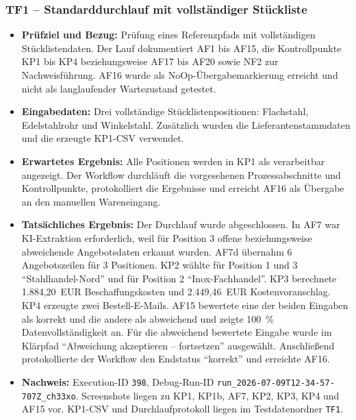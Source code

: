 \documentclass[a4paper,12pt]{article}
\begin{document}
\subsubsection{TF1 -- Standarddurchlauf mit vollständiger Stückliste}

\begin{itemize}
    \setlength{\itemsep}{3pt}
    \setlength{\parsep}{0pt}
    \item \textbf{Prüfziel und Bezug:} Prüfung eines Referenzpfads mit vollständigen Stücklistendaten. Der Lauf dokumentiert AF1 bis AF15, die Kontrollpunkte KP1 bis KP4 beziehungsweise AF17 bis AF20 sowie NF2 zur Nachweisführung. AF16 wurde als NoOp-Übergabemarkierung erreicht und nicht als langlaufender Wartezustand getestet.
    \item \textbf{Eingabedaten:} Drei vollständige Stücklistenpositionen: Flachstahl, Edelstahlrohr und Winkelstahl. Zusätzlich wurden die Lieferantenstammdaten und die erzeugte KP1-CSV verwendet.
    \item \textbf{Erwartetes Ergebnis:} Alle Positionen werden in KP1 als verarbeitbar angezeigt. Der Workflow durchläuft die vorgesehenen Prozessabschnitte und Kontrollpunkte, protokolliert die Ergebnisse und erreicht AF16 als Übergabe an den manuellen Wareneingang.
    \item \textbf{Tatsächliches Ergebnis:} Der Durchlauf wurde abgeschlossen. In AF7 war KI-Extraktion erforderlich, weil für Position 3 offene beziehungsweise abweichende Angebotsdaten erkannt wurden. AF7d übernahm 6 Angebotszeilen für 3 Positionen. KP2 wählte für Position 1 und 3 \enquote{Stahlhandel-Nord} und für Position 2 \enquote{Inox-Fachhandel}. KP3 berechnete 1.884,20~EUR Beschaffungskosten und 2.449,46~EUR Kostenvoranschlag. KP4 erzeugte zwei Bestell-E-Mails. AF15 bewertete eine der beiden Eingaben als korrekt und die andere als abweichend und zeigte 100~\% Datenvollständigkeit an. Für die abweichend bewertete Eingabe wurde im Klärpfad \enquote{Abweichung akzeptieren -- fortsetzen} ausgewählt. Anschließend protokollierte der Workflow den Endstatus \enquote{korrekt} und erreichte AF16.
    \item \textbf{Nachweis:} Execution-ID \texttt{398}, Debug-Run-ID \nolinkurl{run_2026-07-09T12-34-57-707Z_ch33xo}. Screenshots liegen zu KP1, KP1b, AF7, KP2, KP3, KP4 und AF15 vor. KP1-CSV und Durchlaufprotokoll liegen im Testdatenordner \nolinkurl{TF1}.

\end{itemize}
\end{document}
